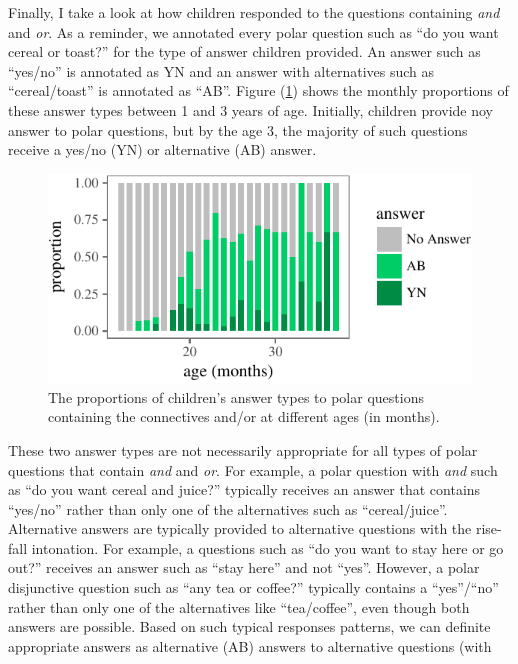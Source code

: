 \documentclass[oneside]{report}
\theoremstyle{definition}
\theoremstyle{definition}
\theoremstyle{definition}
\theoremstyle{remark}
\begin{document}
Finally, I take a look at how children responded to the questions
containing \emph{and} and \emph{or}. As a reminder, we annotated every
polar question such as ``do you want cereal or toast?'' for the type of
answer children provided. An answer such as ``yes/no'' is annotated as
YN and an answer with alternatives such as ``cereal/toast'' is annotated
as ``AB''. Figure (\ref{fig:answerPlot}) shows the monthly proportions
of these answer types between 1 and 3 years of age. Initially, children
provide noy answer to polar questions, but by the age 3, the majority of
such questions receive a yes/no (YN) or alternative (AB) answer.
\begin{figure}[tb]

{\centering \includegraphics{figs/answerPlot-1} 

}

\caption{The proportions of children's answer types to polar questions containing the connectives and/or at different ages (in months).}\label{fig:answerPlot}
\end{figure}
These two answer types are not necessarily appropriate for all types of
polar questions that contain \emph{and} and \emph{or}. For example, a
polar question with \emph{and} such as ``do you want cereal and juice?''
typically receives an answer that contains ``yes/no'' rather than only
one of the alternatives such as ``cereal/juice''. Alternative answers
are typically provided to alternative questions with the rise-fall
intonation. For example, a questions such as ``do you want to stay here
or go out?'' receives an answer such as ``stay here'' and not ``yes''.
However, a polar disjunctive question such as ``any tea or coffee?''
typically contains a ``yes''/``no'' rather than only one of the
alternatives like ``tea/coffee'', even though both answers are possible.
Based on such typical responses patterns, we can definite appropriate
answers as alternative (AB) answers to alternative questions (with
\end{document}
